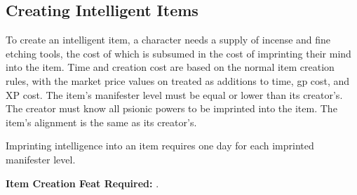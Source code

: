 \subsection{Creating Intelligent Items}
To create an intelligent item, a character needs a supply of incense and fine etching tools, the cost of which is subsumed in the cost of imprinting their mind into the item. Time and creation cost are based on the normal item creation rules, with the market price values on  treated as additions to time, gp cost, and XP cost. The item's manifester level must be equal or lower than its creator's. The creator must know all psionic powers to be imprinted into the item. The item's alignment is the same as its creator's.

Imprinting intelligence into an item requires one day for each imprinted manifester level.

\textbf{Item Creation Feat Required:} .

